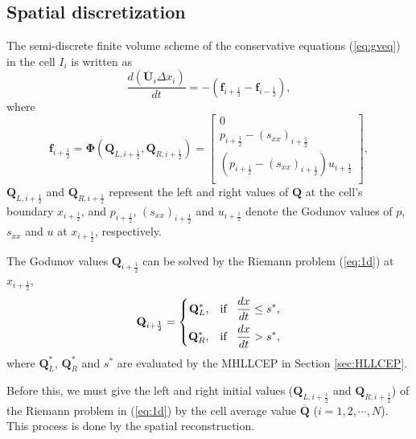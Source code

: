 \documentclass[review]{elsarticle}
\begin{document}
\subsection{Spatial discretization}
The  semi-discrete finite volume scheme of the conservative equations (\ref{eq:gveq}) in the cell $I_i$ is written as
\begin{equation}\label{eq:sem}
  \frac{d(\overline{\mathbf{U}}_i\Delta x_i)}{dt} = -(\mathbf{f}_{i+\frac{1}{2}} - \mathbf{f}_{i-\frac{1}{2}}),
\end{equation}
where
\begin{equation}
  \mathbf{f}_{i+\frac{1}{2}} = \mathbf{\Phi} (\mathbf{Q}_{L,i+\frac{1}{2}}, \mathbf{Q}_{R,i+\frac{1}{2}})  = \left[
    \begin{array}{l}
      0\\
      p_{i+\frac{1}{2}} - (s_{xx})_{i+\frac{1}{2}}\\
      (p_{i+\frac{1}{2}} - (s_{xx})_{i+\frac{1}{2}})u_{i+\frac{1}{2}}\\
    \end{array}
  \right],
\end{equation}
$\mathbf{Q}_{L,i+\frac{1}{2}}$ and $\mathbf{Q}_{R,i+\frac{1}{2}}$ represent the left and right values of $\mathbf{Q}$ at the cell's boundary $x_{i+\frac{1}{2}}$, and  $p_{i+\frac{1}{2}}$, $(s_{xx})_{i+\frac{1}{2}}$ and $u_{i+\frac{1}{2}}$ denote the Godunov values of $p$, $s_{xx}$ and $u$ at $x_{i+\frac{1}{2}}$, respectively.

The Godunov values  $\mathbf{Q}_{i+\frac{1}{2}}$  can be solved  by the Riemann problem  (\ref{eq:1d}) at $x_{i+\frac{1}{2}}$,
\begin{equation}\label{eq:qLR}
  \mathbf{Q}_{i+\frac{1}{2}} = \left\{ \begin{aligned}
    \mathbf{Q}_L^*, \hspace{0.3cm} \text{if} \hspace{0.3cm} \frac{dx}{dt} \le  s^*,\\
    \mathbf{Q}_R^*, \hspace{0.3cm} \text{if} \hspace{0.3cm} \frac{dx}{dt} > s^*,\\
  \end{aligned} \right.
\end{equation}
where $\mathbf{Q}_L^*$, $\mathbf{Q}_R^*$ and $s^*$ are evaluated by the MHLLCEP in Section \ref{sec:HLLCEP}.

Before this, we must give the left  and right initial values ($\mathbf{Q}_{L,i+\frac{1}{2}}$ and $\mathbf{Q}_{R,i+\frac{1}{2}}$) of the Riemann problem in (\ref{eq:1d}) by the cell average value $\overline{\mathbf{Q}}$ ($i = 1,2,\cdots,N$). This process is done by the spatial reconstruction.
\end{document}
